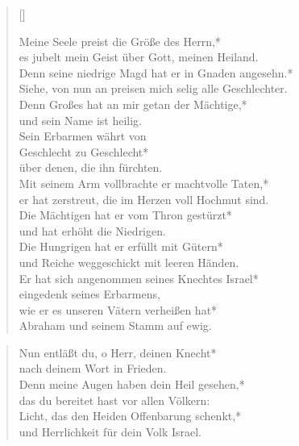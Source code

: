 \vspace{0.6cm}




\begin{verse}[\versewidth]
 
Meine Seele preist die Größe des Herrn,*\\
es jubelt mein Geist über Gott, meinen Heiland.\\
\vin Denn seine niedrige Magd hat er in Gnaden angesehn.*\\
\vin Siehe, von nun an preisen mich selig alle Geschlechter.\\
Denn Großes hat an mir getan der Mächtige,*\\
und sein Name ist heilig.\\
\vin Sein Erbarmen währt von\\ 
\vin Geschlecht zu Geschlecht*\\
\vin über denen, die ihn fürchten.\\

Mit seinem Arm vollbrachte er machtvolle Taten,*\\
er hat zerstreut, die im Herzen voll Hochmut sind.\\
\vin Die Mächtigen hat er vom Thron gestürzt*\\
\vin und hat erhöht die Niedrigen.\\
Die Hungrigen hat er erfüllt mit Gütern*\\
und Reiche weggeschickt mit leeren Händen.\\
\vin Er hat sich angenommen seines Knechtes Israel*\\
\vin eingedenk seines Erbarmens,\\
wie er es unseren Vätern verheißen hat*\\
Abraham und seinem Stamm auf ewig.\\
\end{verse}

\vspace{0.6cm}



\begin{verse}
 
Nun entläßt du, o Herr, deinen Knecht*\\
nach deinem Wort in Frieden.\\
\vin Denn meine Augen haben dein Heil gesehen,*\\
\vin das du bereitet hast vor allen Völkern:\\
Licht, das den Heiden Offenbarung schenkt,*\\
und Herrlichkeit für dein Volk Israel.\\
\end{verse}









